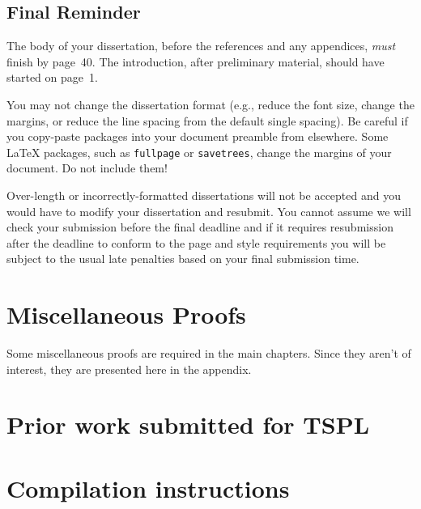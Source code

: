 \documentclass[logo,bsc,singlespacing,parskip,online]{infthesis}
\begin{document}
\section{Final Reminder}

The body of your dissertation, before the references and any appendices,
\emph{must} finish by page~40. The introduction, after preliminary material,
should have started on page~1.

You may not change the dissertation format (e.g., reduce the font size, change
the margins, or reduce the line spacing from the default single spacing). Be
careful if you copy-paste packages into your document preamble from elsewhere.
Some \LaTeX{} packages, such as \texttt{fullpage} or \texttt{savetrees}, change
the margins of your document. Do not include them!

Over-length or incorrectly-formatted dissertations will not be accepted and you
would have to modify your dissertation and resubmit. You cannot assume we will
check your submission before the final deadline and if it requires resubmission
after the deadline to conform to the page and style requirements you will be
subject to the usual late penalties based on your final submission time.





\appendix

\chapter{Miscellaneous Proofs}
\label{appendix:misc_proofs}

Some miscellaneous proofs are required in the main chapters. Since they aren't of interest, they are presented here in the appendix.



\chapter{Prior work submitted for TSPL}
\label{appendix:tspl}


\chapter{Compilation instructions}
\label{appendix:compilation_instructions}
\end{document}
